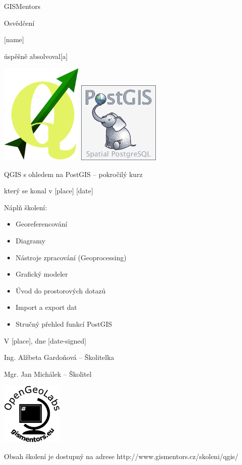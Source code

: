 \documentclass[12pt, a4paper]{letter}
\begin{document}
\pagestyle{empty}
\begin{center}

{\Large GISMentors}

{\Huge Osvědčení}

{\Large [name]}

úspěšně absolvoval[a]

\includegraphics[width=0.30\textwidth]{../images/qgislogo_vector.eps}
\includegraphics[width=0.30\textwidth]{../images/postgis.png}

{\Large QGIS s ohledem na PostGIS -- pokročilý kurz}

který se konal v [place] [date]
\end{center}

Náplň školení:

\begin{itemize}
        \item Georeferencování
        \item Diagramy
        \item Nástroje zpracování (Geoprocessing)
        \item Grafický modeler
        \item Úvod do prostorových dotazů
        \item Import a export dat
        \item Stručný přehled funkcí PostGIS
\end{itemize}

\vfill
\parbox{7cm}{

    V [place], dne [date-signed]\\

\vfill

    Ing. Alžbeta Gardoňová -- Školitelka\\

\vfill
    
    Mgr. Jan Michálek -- Školitel \\

}
\hfill
\parbox{3cm}{
    \includegraphics[width=3cm]{../images/placka.eps}
}


\begin{center}
{\footnotesize Obsah školení je dostupný na adrese
http://www.gismentors.cz/skoleni/qgis/}
\end{center}
\end{document}
